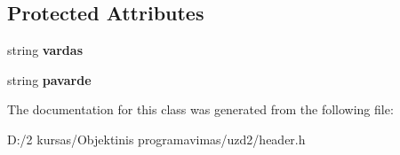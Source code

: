 \subsection*{Protected Attributes}
\begin{DoxyCompactItemize}
\item 
\mbox{\label{class_zmogus_a56da52b45c537a31d2c1fc3a53a73c65}} 
string {\bfseries vardas}
\item 
\mbox{\label{class_zmogus_a00799e1396c82e4f6dffa0edec1f24e5}} 
string {\bfseries pavarde}
\end{DoxyCompactItemize}


The documentation for this class was generated from the following file\+:\begin{DoxyCompactItemize}
\item 
D\+:/2 kursas/\+Objektinis programavimas/uzd2/header.\+h\end{DoxyCompactItemize}
